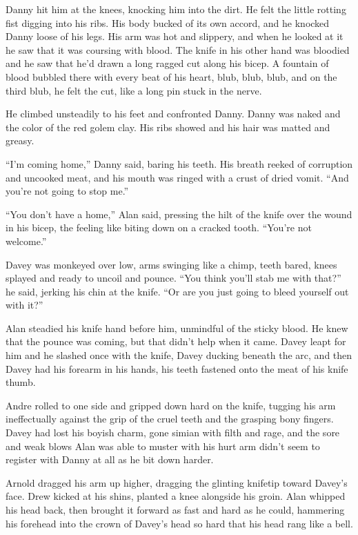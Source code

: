 Danny hit him at the knees, knocking him into the dirt.  He felt the
little rotting fist digging into his ribs.  His body bucked of its own
accord, and he knocked Danny loose of his legs.  His arm was hot and
slippery, and when he looked at it he saw that it was coursing with
blood.  The knife in his other hand was bloodied and he saw that he'd
drawn a long ragged cut along his bicep.  A fountain of blood bubbled
there with every beat of his heart, blub, blub, blub, and on the third
blub, he felt the cut, like a long pin stuck in the nerve.

He climbed unsteadily to his feet and confronted Danny.  Danny was
naked and the color of the red golem clay.  His ribs showed and his
hair was matted and greasy.

``I'm coming home,'' Danny said, baring his teeth.  His breath reeked
of corruption and uncooked meat, and his mouth was ringed with a crust
of dried vomit.  ``And you're not going to stop me.''

``You don't have a home,'' Alan said, pressing the hilt of the knife
over the wound in his bicep, the feeling like biting down on a cracked
tooth.  ``You're not welcome.''

Davey was monkeyed over low, arms swinging like a chimp, teeth bared,
knees splayed and ready to uncoil and pounce.  ``You think you'll stab
me with that?'' he said, jerking his chin at the knife.  ``Or are you
just going to bleed yourself out with it?''

Alan steadied his knife hand before him, unmindful of the sticky
blood.  He knew that the pounce was coming, but that didn't help when
it came.  Davey leapt for him and he slashed once with the knife,
Davey ducking beneath the arc, and then Davey had his forearm in his
hands, his teeth fastened onto the meat of his knife thumb.

Andre rolled to one side and gripped down hard on the knife, tugging
his arm ineffectually against the grip of the cruel teeth and the
grasping bony fingers.  Davey had lost his boyish charm, gone simian
with filth and rage, and the sore and weak blows Alan was able to
muster with his hurt arm didn't seem to register with Danny at all as
he bit down harder.

Arnold dragged his arm up higher, dragging the glinting knifetip
toward Davey's face.  Drew kicked at his shins, planted a knee
alongside his groin.  Alan whipped his head back, then brought it
forward as fast and hard as he could, hammering his forehead into the
crown of Davey's head so hard that his head rang like a bell.


